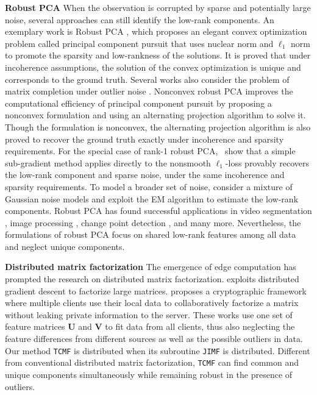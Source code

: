 \documentclass[twoside,11pt]{article}
\def\name{\texttt{TCMF}\xspace}
\def\inneralg{\texttt{JIMF}\xspace}
\newcommand{\matU}{\mathbf{U}}
\newcommand{\matV}{\mathbf{V}}
\begin{document}
\textbf{Robust PCA} When the observation is corrupted by sparse and potentially large noise, several approaches can still identify the low-rank components. An exemplary work is Robust PCA \citep{robustpca}, which proposes an elegant convex optimization problem called principal component pursuit that uses nuclear norm and $\ell_1$ norm to promote the sparsity and low-rankness of the solutions. It is proved that under incoherence assumptions, the solution of the convex optimization is unique and corresponds to the ground truth. Several works also consider the problem of matrix completion under outlier noise \citep{robustmatrixcompletion1,chenfan}. Nonconvex robust PCA \citep{nonconvexrobustpca} improves the computational efficiency of principal component pursuit by proposing a nonconvex formulation and using an alternating projection algorithm to solve it. Though the formulation is nonconvex, the alternating projection algorithm is also proved to recover the ground truth exactly under incoherence and sparsity requirements. For the special case of rank-1 robust PCA,~\citet{fattahi2020exact} show that a simple sub-gradient method applies directly to the nonsmooth $\ell_1$-loss provably recovers the low-rank component and sparse noise, under the same incoherence and sparsity requirements. To model a broader set of noise, \citet{meng2013robust} consider a mixture of Gaussian noise models and exploit the EM algorithm to estimate the low-rank components. Robust PCA has found successful applications in video segmentation \citep{rpcavideo}, image processing \citep{rsubspace}, change point detection \citep{onlinechangepoint}, and many more. Nevertheless, the formulations of robust PCA focus on shared low-rank features among all data and neglect unique components. 

\textbf{Distributed matrix factorization}  The emergence of edge computation has prompted the research on distributed matrix factorization. \citet{dmf} exploits distributed gradient descent to factorize large matrices. \citet{securefmf} proposes a cryptographic framework where multiple clients use their local data to collaboratively factorize a matrix without leaking private information to the server. These works use one set of feature matrices $\matU$ and $\matV$ to fit data from all clients, thus also neglecting the feature differences from different sources as well as the possible outliers in data. Our method \name is distributed when its subroutine \inneralg is distributed. Different from conventional distributed matrix factorization, \name can find common and unique components simultaneously while remaining robust in the presence of outliers.
\end{document}
